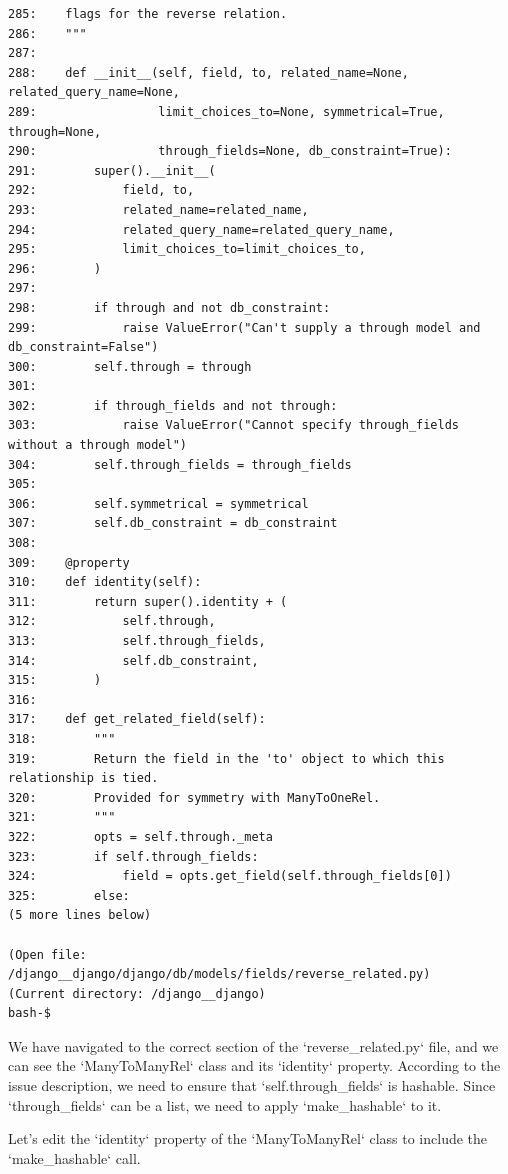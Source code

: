 {\begin{observationbox}
\begin{Verbatim}[breaklines=true, breakanywhere=true]
285:    flags for the reverse relation.
286:    """
287:
288:    def __init__(self, field, to, related_name=None, related_query_name=None,
289:                 limit_choices_to=None, symmetrical=True, through=None,
290:                 through_fields=None, db_constraint=True):
291:        super().__init__(
292:            field, to,
293:            related_name=related_name,
294:            related_query_name=related_query_name,
295:            limit_choices_to=limit_choices_to,
296:        )
297:
298:        if through and not db_constraint:
299:            raise ValueError("Can't supply a through model and db_constraint=False")
300:        self.through = through
301:
302:        if through_fields and not through:
303:            raise ValueError("Cannot specify through_fields without a through model")
304:        self.through_fields = through_fields
305:
306:        self.symmetrical = symmetrical
307:        self.db_constraint = db_constraint
308:
309:    @property
310:    def identity(self):
311:        return super().identity + (
312:            self.through,
313:            self.through_fields,
314:            self.db_constraint,
315:        )
316:
317:    def get_related_field(self):
318:        """
319:        Return the field in the 'to' object to which this relationship is tied.
320:        Provided for symmetry with ManyToOneRel.
321:        """
322:        opts = self.through._meta
323:        if self.through_fields:
324:            field = opts.get_field(self.through_fields[0])
325:        else:
(5 more lines below)

(Open file: /django__django/django/db/models/fields/reverse_related.py)
(Current directory: /django__django)
bash-$
\end{Verbatim}
\end{observationbox}
\begin{agentbox}
We have navigated to the correct section of the `reverse\_related.py` file, and we can see the `ManyToManyRel` class and its `identity` property. According to the issue description, we need to ensure that `self.through\_fields` is hashable. Since `through\_fields` can be a list, we need to apply `make\_hashable` to it.



Let's edit the `identity` property of the `ManyToManyRel` class to include the `make\_hashable` call.




\end{agentbox}}
